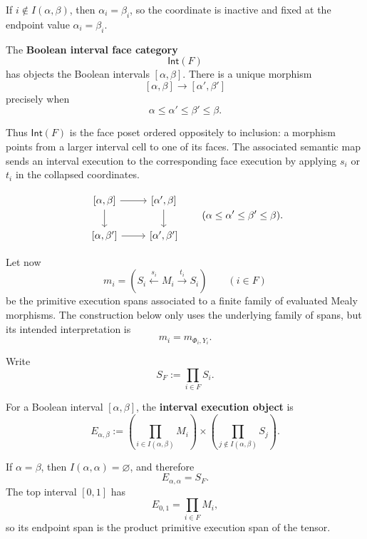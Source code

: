 If \(i\notin I(\alpha,\beta)\), then \(\alpha_i=\beta_i\), so the coordinate
is inactive and fixed at the endpoint value \(\alpha_i=\beta_i\).

\begin{definition}
\label{def:cmett-boolean-interval-face-category}
    The \textbf{Boolean interval face category}
    \[
        \mathsf{Int}(F)
    \]
    has objects the Boolean intervals \([\alpha,\beta]\). There is a unique
    morphism
    \[
        [\alpha,\beta]\longrightarrow[\alpha',\beta']
    \]
    precisely when
    \[
        \alpha\leq\alpha'\leq\beta'\leq\beta.
    \]
\end{definition}

Thus \(\mathsf{Int}(F)\) is the face poset ordered oppositely to inclusion: a
morphism points from a larger interval cell to one of its faces. The
associated semantic map sends an interval execution to the corresponding face
execution by applying \(s_i\) or \(t_i\) in the collapsed coordinates.

\[
\begin{tikzcd}
\left[\alpha,\beta\right]
    \arrow[r]
    \arrow[d]
&
\left[\alpha',\beta\right]
    \arrow[d]
\\
\left[\alpha,\beta'\right]
    \arrow[r]
&
\left[\alpha',\beta'\right]
\end{tikzcd}
\qquad
(\alpha\leq\alpha'\leq\beta'\leq\beta).
\]

Let now
\[
    m_i=
    \left(
        S_i\xleftarrow{s_i}M_i\xrightarrow{t_i}S_i
    \right)
    \qquad (i\in F)
\]
be the primitive execution spans associated to a finite family of evaluated
Mealy morphisms. The construction below only uses the underlying family of
spans, but its intended interpretation is
\[
    m_i=m_{\Phi_i,Y_i}.
\]

Write
\[
    S_F:=\prod_{i\in F}S_i.
\]

\begin{definition}
\label{def:cmett-interval-execution-object}
    For a Boolean interval \([\alpha,\beta]\), the \textbf{interval execution
    object} is
    \[
        E_{\alpha,\beta}
        :=
        \left(\prod_{i\in I(\alpha,\beta)}M_i\right)
        \times
        \left(\prod_{j\notin I(\alpha,\beta)}S_j\right).
    \]
\end{definition}

If \(\alpha=\beta\), then \(I(\alpha,\alpha)=\varnothing\), and therefore
\[
    E_{\alpha,\alpha}=S_F.
\]
The top interval \([0,1]\) has
\[
    E_{0,1}=\prod_{i\in F}M_i,
\]
so its endpoint span is the product primitive execution span of the tensor.

